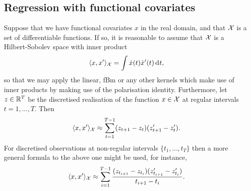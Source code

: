 \subsection{Regression with functional covariates}
\label{sec:regfunctionalcov}

Suppose that we have functional covariates $x$ in the real domain, and that ${\mathcal X}$ is a set of differentiable functions.
If so, it is reasonable to assume that ${\mathcal X}$ is a Hilbert-Sobolev space with inner product
\begin{equation}\label{eq:hilbsobip1}
  \langle x,x' \rangle_{\mathcal X} = \int \dot{x}(t) \dot{x}'(t) \operatorname{d}\hspace{0.5pt}\! t,
\end{equation}
so that we may apply the linear, fBm or any other kernels which make use of inner products by making use of the polarisation identity.
Furthermore, let $z \in \mathbb{R}^T$ be the discretised realisation of the function $x \in {\mathcal X}$ at regular intervals $t = 1,\dots,T$. Then
\begin{equation}\label{eq:hilbsobip2}
  \langle x,x' \rangle_{\mathcal X} \approx \sum_{t=1}^{T-1} (z_{t+1} - z_t)(z'_{t+1} - z_t').
\end{equation}
For discretised observations at non-regular intervals $\{t_1,\dots,t_T\}$ then a more general formula to the above one might be used, for instance,
\begin{equation}\label{eq:hilbsobip3}
  \langle x,x' \rangle_{\mathcal X} \approx \sum_{i=1}^{T-1} \frac{(z_{t_{i+1}} - z_{t_i})(z'_{t_{i+1}} - z_{t_i}')}{t_{i+1} - t_{i}}.
\end{equation}

%





